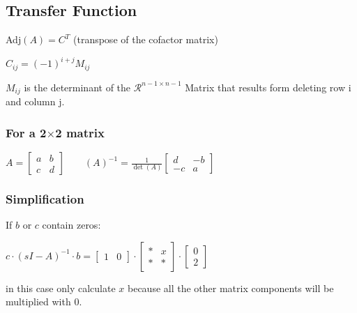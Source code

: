 \documentclass[10pt,a4paper]{scrartcl}
\begin{document}
\begin{multicols*}{3}
	\subsection{Transfer Function}\label{SisoTF}
	
	
	
	\large
	\normalsize
	
	Adj$(A)=C^T$ (transpose of the cofactor matrix)
	
	$C_{ij}=(-1)^{i+j}M_{ij}$
	
	$M_{ij}$ is the determinant of the $\mathcal{R}^{n-1\times n-1}$ Matrix that results form deleting row i and column j.
	
	\subsubsection{For a 2$\times$2 matrix}
	
	\large
	$A=\begin{bmatrix}
	a&b\\
	c&d
	\end{bmatrix}\qquad (A)^{-1}=\frac{1}{\det(A)}\begin{bmatrix}d&-b\\-c&a\end{bmatrix}$
	\normalsize
	
	\subsubsection{Simplification}
	
	If $b$ or $c$ contain zeros:
	
	$c\cdot(sI-A)^{-1}\cdot b=\begin{bmatrix}1&0\end{bmatrix}\cdot\begin{bmatrix}*&x\\ * & *\end{bmatrix}\cdot\begin{bmatrix}0\\2\end{bmatrix}$
	
	in this case only calculate $x$ because all the other matrix components will be multiplied with 0.
	

\end{multicols*}
\end{document}
